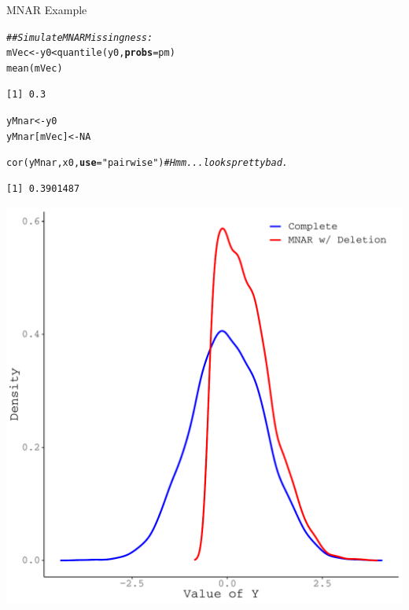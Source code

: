\documentclass{beamer}\usepackage[]{graphicx}\usepackage[]{color}
\makeatletter
\newcommand{\hlnum}[1]{\textcolor[rgb]{0.69,0.494,0}{#1}}%
\newcommand{\hlstr}[1]{\textcolor[rgb]{0.749,0.012,0.012}{#1}}%
\newcommand{\hlcom}[1]{\textcolor[rgb]{0.514,0.506,0.514}{\textit{#1}}}%
\newcommand{\hlopt}[1]{\textcolor[rgb]{0,0,0}{#1}}%
\newcommand{\hlstd}[1]{\textcolor[rgb]{0,0,0}{#1}}%
\newcommand{\hlkwb}[1]{\textcolor[rgb]{0,0.341,0.682}{#1}}%
\newcommand{\hlkwc}[1]{\textcolor[rgb]{0,0,0}{\textbf{#1}}}%
\newcommand{\hlkwd}[1]{\textcolor[rgb]{0.004,0.004,0.506}{#1}}%
\newenvironment{kframe}{%
 \def\at@end@of@kframe{}%
 \ifinner\ifhmode%
  \def\at@end@of@kframe{\end{minipage}}%
  \begin{minipage}{\columnwidth}%
 \fi\fi%
 \def\FrameCommand##1{\hskip\@totalleftmargin \hskip-\fboxsep
 \colorbox{shadecolor}{##1}\hskip-\fboxsep
     \hskip-\linewidth \hskip-\@totalleftmargin \hskip\columnwidth}%
 \MakeFramed {\advance\hsize-\width
   \@totalleftmargin\z@ \linewidth\hsize
   \@setminipage}}%
 {\par\unskip\endMakeFramed%
 \at@end@of@kframe}
\newenvironment{knitrout}{}{} %
\makeatother
\begin{document}

\begin{frame}{MNAR Example}

\begin{knitrout}\footnotesize
{}\color{fgcolor}\begin{kframe}
\begin{alltt}
\hlcom{## Simulate MNAR Missingness:}
\hlstd{mVec} \hlkwb{<-} \hlstd{y0} \hlopt{<} \hlkwd{quantile}\hlstd{(y0,} \hlkwc{probs} \hlstd{= pm)}
\hlkwd{mean}\hlstd{(mVec)}
\end{alltt}
\begin{verbatim}
[1] 0.3
\end{verbatim}
\begin{alltt}
\hlstd{yMnar}       \hlkwb{<-} \hlstd{y0}
\hlstd{yMnar[mVec]} \hlkwb{<-} \hlnum{NA}

\hlkwd{cor}\hlstd{(yMnar, x0,} \hlkwc{use} \hlstd{=} \hlstr{"pairwise"}\hlstd{)} \hlcom{# Hmm...looks pretty bad.}
\end{alltt}
\begin{verbatim}
[1] 0.3901487
\end{verbatim}
\end{kframe}
\end{knitrout}

\pagebreak

\begin{knitrout}\footnotesize
{}\color{fgcolor}

{\centering \includegraphics[width=0.65\linewidth]{figure/intro-unnamed-chunk-16-1} 

}


\end{knitrout}

\end{frame}
\end{document}
